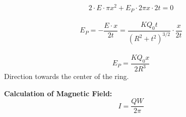 \documentclass[11pt,a4paper]{scrartcl}
\begin{document}
\begin{solution}
\begin{center}
\begin{tikzpicture}[x=0.75pt,y=0.75pt,yscale=-1,xscale=1]
\end{tikzpicture}
\end{center}
$$2\cdot E\cdot\pi x^2 + E_P\cdot 2\pi x\cdot2t=0$$ \\
$$E_P=-\frac{E\cdot x}{2t}=\frac{KQ_0t}{(R^2+t^2)^{3/2}}\cdot\frac{x}{2t}$$ \\
$$E_P=\frac{KQ_0x}{2R^3}$$
Direction towards the center of the ring.

{\Large{\textbf{Calculation of Magnetic Field:}}}
$$I=\frac{QW}{2\pi}$$ \\
\begin{center}
    
 

\begin{tikzpicture}[x=0.75pt,y=0.75pt,yscale=-1,xscale=1]


\end{tikzpicture}
\end{center}
\end{solution}
\end{document}
